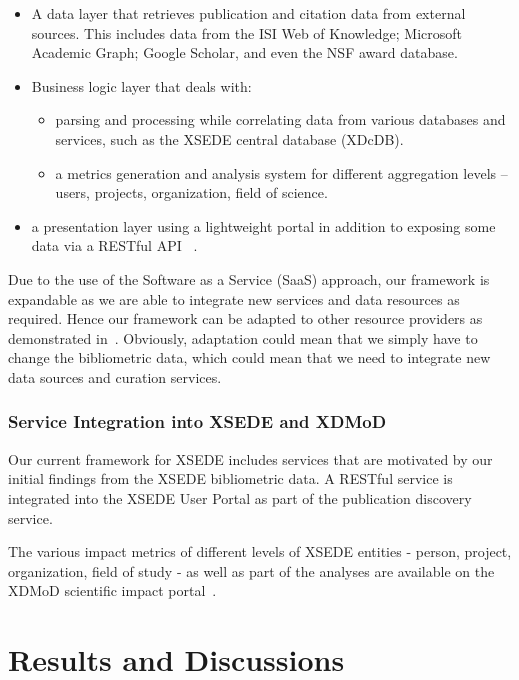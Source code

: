 \documentclass{sig-alternate}
\begin{document}
\begin{itemize}
\item A data layer that retrieves publication and citation data from
  external sources.  This includes data from the ISI Web of Knowledge;
  Microsoft Academic Graph; Google Scholar, and even the NSF award
  database.
\item Business logic layer that deals with:

  \begin{itemize}
  \item parsing and processing while correlating data from various
    databases and services, such as the XSEDE central database
    (XDcDB).
  \item a metrics generation and analysis system for different
    aggregation levels -- users, projects, organization, field of
    science.
  \end{itemize}

\item a presentation layer using a lightweight portal in addition to
  exposing some data via a RESTful API
  ~\cite{Wang:2014:TSI:2616498.2616507}.
\end{itemize}

Due to the use of the Software as a Service (SaaS) approach, our
framework is expandable as we are able to integrate new services and
data resources as required. Hence our framework can be adapted to
other resource providers as demonstrated in~\cite{tas2015}. Obviously,
adaptation could mean that we simply have to change the bibliometric
data, which could mean that we need to integrate new data sources and
curation services.

\subsubsection{Service Integration into XSEDE and XDMoD}

Our current framework for XSEDE includes services that are motivated
by our initial findings from the XSEDE bibliometric data. A RESTful
service is integrated into the XSEDE User Portal as part of the
publication discovery service.

The various impact metrics of different levels of XSEDE entities -
person, project, organization, field of study - as well as part of the
analyses are available on the XDMoD scientific impact
portal~\cite{www-xdmod-sciimp}.

\section{Results and Discussions} \label{S:result}
\end{document}
